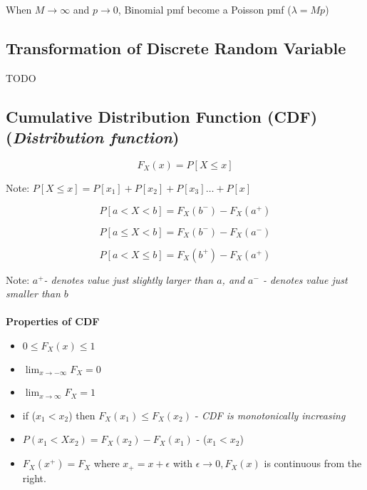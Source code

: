 When $M\rightarrow \infty$ and $p\rightarrow 0$, Binomial pmf become a Poisson pmf ($\lambda=Mp$)

\subsection{Transformation of Discrete Random Variable}
TODO

\subsection{Cumulative Distribution Function (CDF) \\ (\emph{Distribution function})}
\begin{equation*}
	F_{X}(x)=P[X\leq x]
\end{equation*}

Note: \emph{$P[X\leq x] = P[x_{1}]+P[x_{2}]+P[x_{3}]\dots+P[x]$}

\begin{equation*}
	P[a < X < b]=F_{X}(b^{-})-F_{X}(a^{+})
\end{equation*}

\begin{equation*}
	P[a \leq X < b]=F_{X}(b^{-})-F_{X}(a^{-})
\end{equation*}

\begin{equation*}
	P[a < X \leq b]=F_{X}(b^{+})-F_{X}(a^{+})
\end{equation*}

Note: \emph{$a^{+}$- denotes value just slightly larger than $a$, and $a^{-}$ - denotes value just smaller than $b$}\\\\

\textbf{Properties of CDF}
\begin{itemize}
	\item $0 \leq F_{X}(x) \leq 1$
	\item $\displaystyle\lim_{x\to-\infty}F_{X}=0$ 
	\item $\displaystyle\lim_{x\to\infty}F_{X}=1$
	\item if ($x_{1}<x_{2}$) then $F_{X}(x_{1}) \leq F_{X}(x_{2})$ - \emph{CDF is monotonically increasing}
	\item $P(x_{1} < X x_{2})=F_{X}(x_{2})-F_{X}(x_{1})$ - ($x_{1} < x_{2}$)
	\item $F_{X}(x^{+})=F_{X}$ where $x_{+}=x+ \epsilon $ with $\epsilon\rightarrow 0, F_{X}(x) $ is continuous from the right.
\end{itemize}

